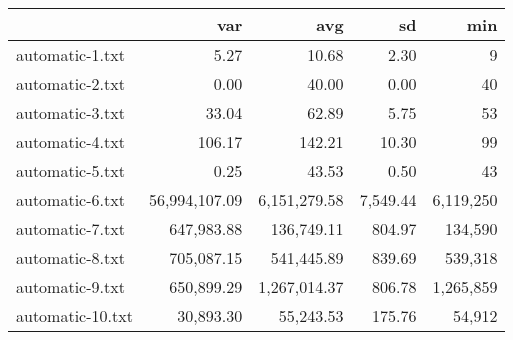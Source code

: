 \begin{tabular}{lrrrr}
  \toprule  & var & avg & sd & min \\ 
  \midrule automatic-1.txt & 5.27 & 10.68 & 2.30 & 9 \\ 
  automatic-2.txt & 0.00 & 40.00 & 0.00 & 40 \\ 
  automatic-3.txt & 33.04 & 62.89 & 5.75 & 53 \\ 
  automatic-4.txt & 106.17 & 142.21 & 10.30 & 99 \\ 
  automatic-5.txt & 0.25 & 43.53 & 0.50 & 43 \\ 
  automatic-6.txt & 56,994,107.09 & 6,151,279.58 & 7,549.44 & 6,119,250 \\ 
  automatic-7.txt & 647,983.88 & 136,749.11 & 804.97 & 134,590 \\ 
  automatic-8.txt & 705,087.15 & 541,445.89 & 839.69 & 539,318 \\ 
  automatic-9.txt & 650,899.29 & 1,267,014.37 & 806.78 & 1,265,859 \\ 
  automatic-10.txt & 30,893.30 & 55,243.53 & 175.76 & 54,912 \\ 
   \bottomrule \end{tabular}
